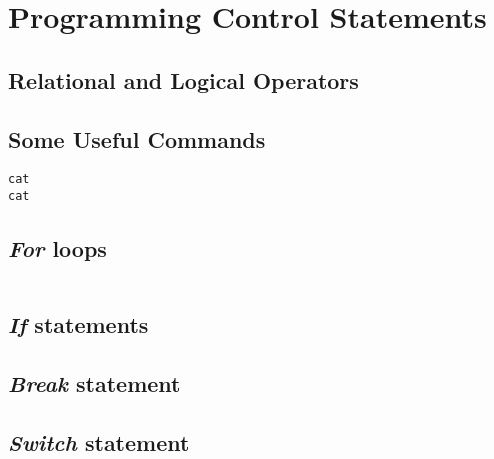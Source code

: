 

\section{Programming Control Statements}
\subsection{Relational and Logical Operators}


\subsection{Some Useful Commands}


\begin{description}
\item[\texttt{cat}]

\item[\texttt{cat}]
\end{description}
\subsection{\textit{For} loops}
\begin{framed}
\begin{verbatim}

\end{verbatim}
\end{framed}
\subsection{\textit{If} statements}


\subsection{\textit{Break} statement}


\subsection{\textit{Switch} statement}


